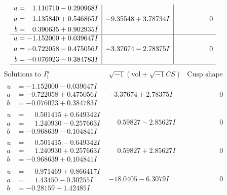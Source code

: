 \documentclass[1p]{elsarticle_modified}
\theoremstyle{definition}
\newcommand{\I}{\sqrt{-1}}
\begin{document}
$$\begin{array}{c|c|c}
\begin{aligned}
u &= \phantom{-}1.110710 - 0.290968 I \\
a &= -1.135840 + 0.546865 I \\
b &= \phantom{-}0.390635 + 0.902935 I\end{aligned}
 & -9.35548 + 3.78734 I & \phantom{-0.000000 } 0 \\ \hline\begin{aligned}
u &= -1.152000 + 0.039647 I \\
a &= -0.722058 - 0.475056 I \\
b &= -0.076023 - 0.384783 I\end{aligned}
 & -3.37674 - 2.78375 I & \phantom{-0.000000 } 0\\
 \hline 
 \end{array}$$\newpage$$\begin{array}{c|c|c}  
\text{Solutions to }I^u_{1}& \I (\text{vol} + \sqrt{-1}CS) & \text{Cusp shape}\\
 \hline 
\begin{aligned}
u &= -1.152000 - 0.039647 I \\
a &= -0.722058 + 0.475056 I \\
b &= -0.076023 + 0.384783 I\end{aligned}
 & -3.37674 + 2.78375 I & \phantom{-0.000000 } 0 \\ \hline\begin{aligned}
u &= \phantom{-}0.501415 + 0.649342 I \\
a &= \phantom{-}1.240930 - 0.257663 I \\
b &= -0.968639 - 0.104841 I\end{aligned}
 & \phantom{-}0.59827 - 2.85627 I & \phantom{-0.000000 } 0 \\ \hline\begin{aligned}
u &= \phantom{-}0.501415 - 0.649342 I \\
a &= \phantom{-}1.240930 + 0.257663 I \\
b &= -0.968639 + 0.104841 I\end{aligned}
 & \phantom{-}0.59827 + 2.85627 I & \phantom{-0.000000 } 0 \\ \hline\begin{aligned}
u &= \phantom{-}0.971469 + 0.866417 I \\
a &= \phantom{-}1.43450 - 0.30255 I \\
b &= -0.28159 + 1.42485 I\end{aligned}
 & -18.0405 - 6.3079 I & \phantom{-0.000000 } 0 \\ \hline\begin{aligned}

\end{aligned}
\end{array}$$
\end{document}
